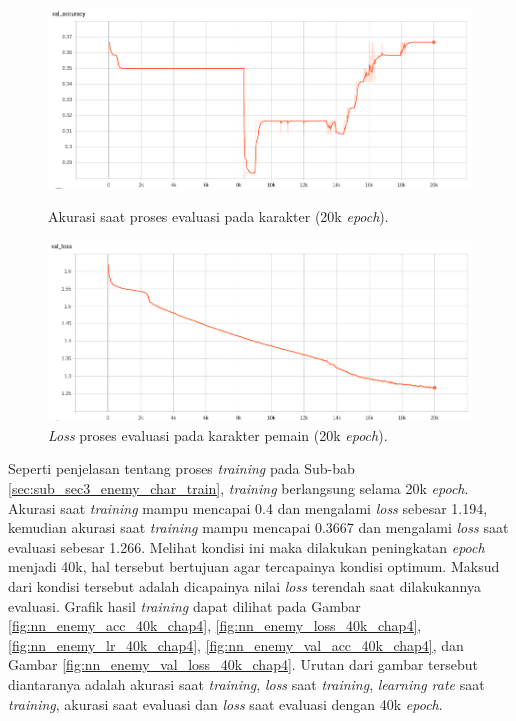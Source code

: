\begin{figure} [!h] \centering
	\includegraphics[scale=0.42]{img/enemy_val_acc_chap4.png}
	\caption{Akurasi saat proses evaluasi pada karakter (20k \textit{epoch}).}
	\label{fig:nn_enemy_val_acc_chap4}
	\vspace{4ex}
	
	\includegraphics[scale=0.42]{img/enemy_val_loss_chap4.png}
	\caption{\textit{Loss} proses evaluasi pada karakter pemain (20k \textit{epoch}).}
	\label{fig:nn_enemy_val_loss_chap4}
	\vspace{-1ex}
\end{figure}

Seperti penjelasan tentang proses \textit{training} pada Sub-bab \ref{sec:sub_sec3_enemy_char_train}, \textit{training} berlangsung selama 20k \textit{epoch}. Akurasi saat \textit{training} mampu mencapai 0.4 dan mengalami \textit{loss} sebesar 1.194, kemudian akurasi saat \textit{training} mampu mencapai 0.3667 dan mengalami \textit{loss} saat evaluasi sebesar 1.266. Melihat kondisi ini maka dilakukan peningkatan \textit{epoch} menjadi 40k, hal tersebut bertujuan agar tercapainya kondisi optimum. Maksud dari kondisi tersebut adalah dicapainya nilai \textit{loss} terendah saat dilakukannya evaluasi. Grafik hasil \textit{training} dapat dilihat pada Gambar \ref{fig:nn_enemy_acc_40k_chap4}, \ref{fig:nn_enemy_loss_40k_chap4}, \ref{fig:nn_enemy_lr_40k_chap4}, \ref{fig:nn_enemy_val_acc_40k_chap4}, dan Gambar \ref{fig:nn_enemy_val_loss_40k_chap4}. Urutan dari gambar tersebut diantaranya adalah akurasi saat \textit{training}, \textit{loss} saat \textit{training}, \textit{learning rate} saat \textit{training}, akurasi saat evaluasi dan \textit{loss} saat evaluasi dengan 40k \textit{epoch}.


